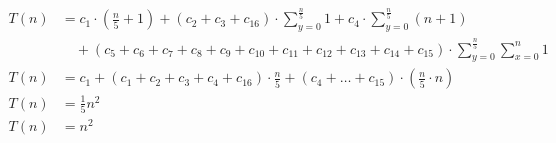 \begin{subequations}
\begin{align}
\label{eq:findedgels1}
T(n)& =
c_1 \cdot (\frac{n}{5} + 1) + (c_2 + c_3 + c_{16}) \cdot \sum_{y=0}^{\frac{n}{5}} 1
 + c_4 \cdot \sum_{y=0}^{\frac{n}{5}} (n+1) \\
& \quad + (c_5 + c_6 + c_7 + c_8 + c_9 + c_{10} + c_{11} + c_{12} + c_{13} + c_{14} + c_{15})
 \cdot \sum_{y=0}^{\frac{n}{5}} \sum_{x=0}^{n} 1 \nonumber \\
\label{eq:findedgels2}
T(n)& = c_1 + (c_1 + c_2 + c_3 + c_4 + c_{16}) \cdot \frac{n}{5} + (c_4 + \ldots + c_{15})
\cdot (\frac{n}{5} \cdot n) \\
\label{eq:findedgels3}
T(n)& = \frac{1}{5}n^2 \\
\label{eq:findedgels1-end}
T(n)& = n^2
\end{align}
\end{subequations}
